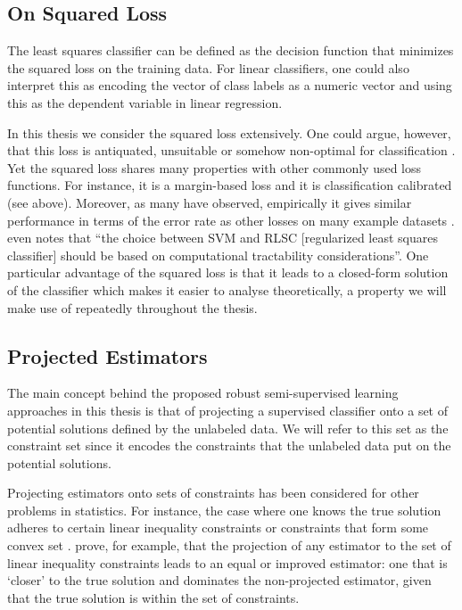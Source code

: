 \documentclass[twoside]{memoir}\usepackage[]{graphicx}\usepackage{xcolor}
\renewcommand{\cite}{\citep}
\begin{document}
\subsection{On Squared Loss}
The least squares classifier can be defined as the decision function that minimizes the squared loss on the training data. For linear classifiers, one could also interpret this as encoding the vector of class labels as a numeric vector and using this as the dependent variable in linear regression.

In this thesis we consider the squared loss extensively. One could argue, however, that this loss is antiquated, unsuitable or somehow non-optimal for classification \cite{Ben-David2012}. Yet the squared loss shares many properties with other commonly used loss functions. For instance, it is a margin-based loss and it is classification calibrated (see above). Moreover, as many have observed, empirically it gives similar performance in terms of the error rate as other losses on many example datasets \cite{Rifkin2003, Poggio2003, Zhang2004, Rasmussen2005}.  \citet{Rifkin2002} even notes that ``the choice between SVM and RLSC [regularized least squares classifier] should be based on computational tractability considerations''. One particular advantage of the squared loss is that it leads to a closed-form solution of the classifier which makes it easier to analyse theoretically, a property we will make use of repeatedly throughout the thesis.

\subsection{Projected Estimators}
The main concept behind the proposed robust semi-supervised learning approaches in this thesis is that of projecting a supervised classifier onto a set of potential solutions defined by the unlabeled data. We will refer to this set as the constraint set since it encodes the constraints that the unlabeled data put on the potential solutions.

Projecting estimators onto sets of constraints has been considered for other problems in statistics. For instance, the case where one knows the true solution adheres to certain linear inequality constraints \citep{Schmidt1995, Schmidt1996} or constraints that form some convex set \citep{Stahlecker1996}. \citet{Schmidt1995} prove, for example, that the projection of any estimator to the set of linear inequality constraints leads to an equal or improved estimator: one that is `closer' to the true solution and dominates the non-projected estimator, given that the true solution is within the set of constraints. 
\end{document}
